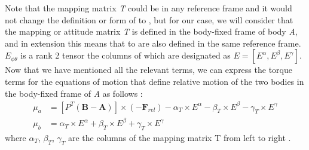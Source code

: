 %
Note that the mapping matrix \textit{T} could be in any reference frame and it would not change the definition or form of  to , but for our case, we will consider that the mapping or attitude matrix \textit{T} is defined in the body-fixed frame of body \textit{A}, and in extension this means that  to  are also defined in the same reference frame. $E_{\phi \theta}$ is a rank 2 tensor the columns of which are designated as $E = [E^\alpha, E^\beta, E^\gamma]$. Now that we have mentioned all the relevant terms, we can express the torque terms for the equations of motion that define relative motion of the two bodies in the body-fixed frame of \textit{A} as follows \cite{fahn_poly}:
\begin{align}
\label{torque_on_a}
\mu_a &= \left[P^T(\mathbf{B}-\mathbf{A})\right] \times (-\mathbf{F}_{rel}) - \alpha_T \times E^\alpha - \beta_T \times E^\beta - \gamma_T \times E^\gamma \\
\label{torque_on_b}
\mu_b &= \alpha_T \times E^\alpha + \beta_T \times E^\beta + \gamma_T \times E^\gamma
\end{align}
%
where $\alpha_T$, $\beta_T$, $\gamma_T$ are the columns of the mapping matrix T from left to right \cite{fahn_poly}.

